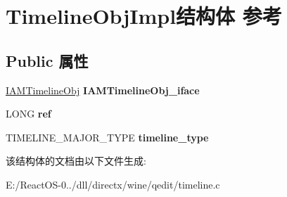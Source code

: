 \hypertarget{struct_timeline_obj_impl}{}\section{Timeline\+Obj\+Impl结构体 参考}
\label{struct_timeline_obj_impl}
\subsection*{Public 属性}
\begin{DoxyCompactItemize}
\item 
\mbox{\label{struct_timeline_obj_impl_a2d03d41e2360a4e919ffb726ca67ecd2}} 
\hyperlink{interface_i_a_m_timeline_obj}{I\+A\+M\+Timeline\+Obj} {\bfseries I\+A\+M\+Timeline\+Obj\+\_\+iface}
\item 
\mbox{\label{struct_timeline_obj_impl_a4e81d3e05255babad9ba2ea7179c2051}} 
L\+O\+NG {\bfseries ref}
\item 
\mbox{\label{struct_timeline_obj_impl_aa8885bf48be3f6ddb18bab16ab0ec4e9}} 
T\+I\+M\+E\+L\+I\+N\+E\+\_\+\+M\+A\+J\+O\+R\+\_\+\+T\+Y\+PE {\bfseries timeline\+\_\+type}
\end{DoxyCompactItemize}


该结构体的文档由以下文件生成\+:\begin{DoxyCompactItemize}
\item 
E\+:/\+React\+O\+S-\/0../dll/directx/wine/qedit/timeline.\+c\end{DoxyCompactItemize}
